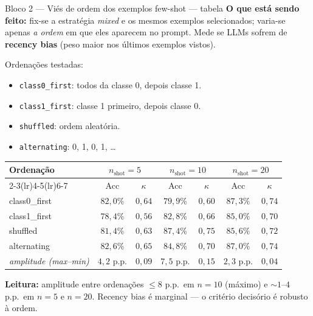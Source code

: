 \documentclass[aspectratio=169,10pt]{beamer}
\begin{document}
\begin{frame}{Bloco 2 --- Vi\'es de ordem dos exemplos few-shot --- tabela}
  \scriptsize
  \textbf{O que est\'a sendo feito:} fix-se a estrat\'egia \emph{mixed} e os mesmos exemplos selecionados; varia-se apenas \emph{a ordem} em que eles aparecem no prompt. Mede se LLMs sofrem de \textbf{recency bias} (peso maior nos \'ultimos exemplos vistos).

  Ordena\c{c}\~oes testadas:
  \begin{itemize}\setlength\itemsep{0.05em}
    \item \texttt{class0\_first}: todos da classe 0, depois classe 1.
    \item \texttt{class1\_first}: classe 1 primeiro, depois classe 0.
    \item \texttt{shuffled}: ordem aleat\'oria.
    \item \texttt{alternating}: 0, 1, 0, 1, \ldots
  \end{itemize}
  \begin{center}
  \begin{tabular}{lcccccc}
    \toprule
    Ordena\c{c}\~ao & \multicolumn{2}{c}{$n_{\text{shot}}=5$} & \multicolumn{2}{c}{$n_{\text{shot}}=10$} & \multicolumn{2}{c}{$n_{\text{shot}}=20$} \\
    \cmidrule(lr){2-3}\cmidrule(lr){4-5}\cmidrule(lr){6-7}
                 & Acc & $\kappa$ & Acc & $\kappa$ & Acc & $\kappa$ \\
    \midrule
    class0\_first & $82{,}0\%$ & $0{,}64$ & $79{,}9\%$ & $0{,}60$ & $87{,}3\%$ & $0{,}74$ \\
    class1\_first & $78{,}4\%$ & $0{,}56$ & $82{,}8\%$ & $0{,}66$ & $85{,}0\%$ & $0{,}70$ \\
    shuffled     & $81{,}4\%$ & $0{,}63$ & \textbf{$87{,}4\%$} & \textbf{$0{,}75$} & $85{,}6\%$ & $0{,}72$ \\
    alternating  & $82{,}6\%$ & $0{,}65$ & $84{,}8\%$ & $0{,}70$ & $87{,}0\%$ & $0{,}74$ \\
    \midrule
    \textit{amplitude (max--min)} & $4{,}2$ p.p. & $0{,}09$ & $7{,}5$ p.p. & $0{,}15$ & $2{,}3$ p.p. & $0{,}04$ \\
    \bottomrule
  \end{tabular}
  \end{center}
  \tiny
  \textbf{Leitura:} amplitude entre ordena\c{c}\~oes $\leq 8$ p.p.\ em $n=10$ (m\'aximo) e $\sim 1$--$4$ p.p.\ em $n=5$ e $n=20$. Recency bias \'e marginal --- o crit\'erio decis\'orio \'e robusto \`a ordem.
\end{frame}
\end{document}
